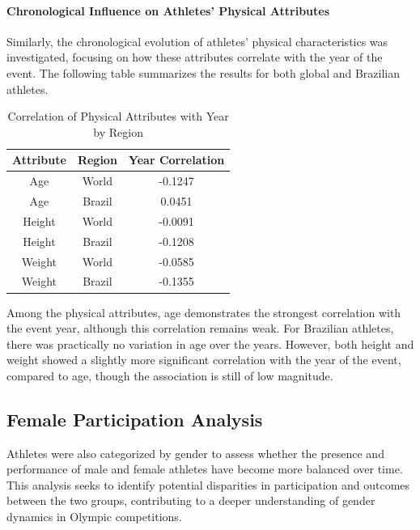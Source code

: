 \documentclass{article}
\begin{document}
\paragraph{Chronological Influence on Athletes' Physical Attributes}

Similarly, the chronological evolution of athletes' physical characteristics was investigated, focusing on how these attributes correlate with the year of the event. The following table summarizes the results for both global and Brazilian athletes.

\begin{table}[h!]
    \centering
    \caption{Correlation of Physical Attributes with Year by Region}
    \begin{tabular}{|c|c|c|}
        \hline
        \textbf{Attribute} & \textbf{Region} & \textbf{Year Correlation} \\
        \hline
        Age     & World   & -0.1247 \\
        Age     & Brazil  & 0.0451 \\
        Height  & World   & -0.0091 \\
        Height  & Brazil  & -0.1208 \\
        Weight  & World   & -0.0585 \\
        Weight  & Brazil  & -0.1355 \\
        \hline
    \end{tabular}
\end{table}

Among the physical attributes, age demonstrates the strongest correlation with the event year, although this correlation remains weak. For Brazilian athletes, there was practically no variation in age over the years. However, both height and weight showed a slightly more significant correlation with the year of the event, compared to age, though the association is still of low magnitude.


\subsection{Female Participation Analysis}

Athletes were also categorized by gender to assess whether the presence and performance of male and female athletes have become more balanced over time. This analysis seeks to identify potential disparities in participation and outcomes between the two groups, contributing to a deeper understanding of gender dynamics in Olympic competitions.
\end{document}
